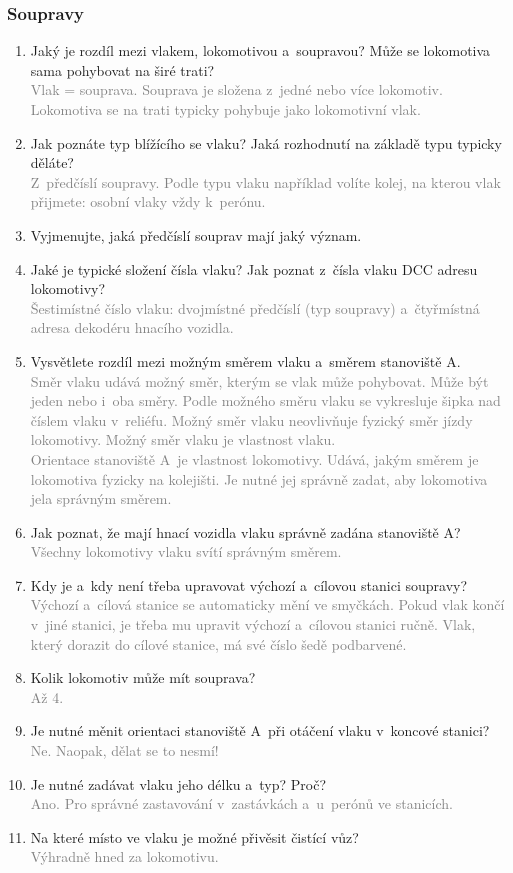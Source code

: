 \documentclass[12pt,a4paper]{article}
\newcommand{\solution}[1]{\\ \textcolor{gray}{#1}}
\newcommand{\solution}[1]{}
\begin{document}
\subsubsection*{Soupravy}
\begin{enumerate}[leftmargin=*]
\item Jaký je rozdíl mezi vlakem, lokomotivou a~soupravou? Může se lokomotiva
sama pohybovat na širé trati?
\solution{Vlak = souprava. Souprava je složena z~jedné nebo více lokomotiv.
Lokomotiva se na trati typicky pohybuje jako lokomotivní vlak.}

\item Jak poznáte typ blížícího se vlaku? Jaká rozhodnutí na základě typu
typicky děláte?
\solution{Z~předčíslí soupravy. Podle typu vlaku například volíte kolej, na
kterou vlak přijmete: osobní vlaky vždy k~perónu.}

\item Vyjmenujte, jaká předčíslí souprav mají jaký význam.

\item Jaké je typické složení čísla vlaku? Jak poznat z~čísla vlaku DCC adresu
lokomotivy?
\solution{Šestimístné číslo vlaku: dvojmístné předčíslí (typ soupravy)
a~čtyřmístná adresa dekodéru hnacího vozidla.}

\item Vysvětlete rozdíl mezi možným směrem vlaku a~směrem stanoviště A.
\solution{Směr vlaku udává možný směr, kterým se vlak může pohybovat. Může být
jeden nebo i~oba směry. Podle možného směru vlaku se vykresluje šipka nad
číslem vlaku v~reliéfu. Možný směr vlaku neovlivňuje fyzický směr jízdy
lokomotivy. Možný směr vlaku je vlastnost vlaku. \\ Orientace stanoviště A~je
vlastnost lokomotivy. Udává, jakým směrem je lokomotiva fyzicky na kolejišti.
Je nutné jej správně zadat, aby lokomotiva jela správným směrem.}

\item Jak poznat, že mají hnací vozidla vlaku správně zadána stanoviště A?
\solution{Všechny lokomotivy vlaku svítí správným směrem.}

\item Kdy je a~kdy není třeba upravovat výchozí a~cílovou stanici soupravy?
\solution{Výchozí a~cílová stanice se automaticky mění ve smyčkách. Pokud vlak
končí v~jiné stanici, je třeba mu upravit výchozí a~cílovou stanici ručně.
Vlak, který dorazit do cílové stanice, má své číslo šedě podbarvené.}

\item Kolik lokomotiv může mít souprava?
\solution{Až 4.}

\item Je nutné měnit orientaci stanoviště A~při otáčení vlaku v~koncové
stanici?
\solution{Ne. Naopak, dělat se to nesmí!}

\item Je nutné zadávat vlaku jeho délku a~typ? Proč?
\solution{Ano. Pro správné zastavování v~zastávkách a~u~perónů ve stanicích.}

\item Na které místo ve vlaku je možné přivěsit čistící vůz?
\solution{Výhradně hned za lokomotivu.}

\end{enumerate}
\end{document}
